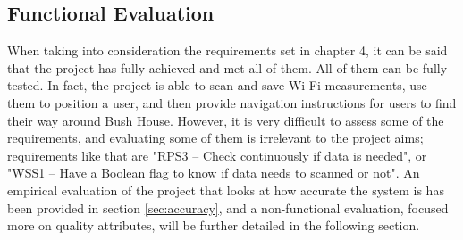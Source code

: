 \subsection{Functional Evaluation}
When taking into consideration the requirements set in chapter 4, it can be said that the project has fully achieved and met all of them. All of them can be fully tested. In fact, the project is able to scan and save Wi-Fi measurements, use them to position a user, and then provide navigation instructions for users to find their way around Bush House. However, it is very difficult to assess some of the requirements, and evaluating some of them is irrelevant to the project aims; requirements like that are "RPS3 – Check continuously if data is needed", or "WSS1 – Have a Boolean flag to know if data needs to scanned or not". An empirical evaluation of the project that looks at how accurate the system is has been provided in section \ref{sec:accuracy}, and a non-functional evaluation, focused more on quality attributes, will be further detailed in the following section.

